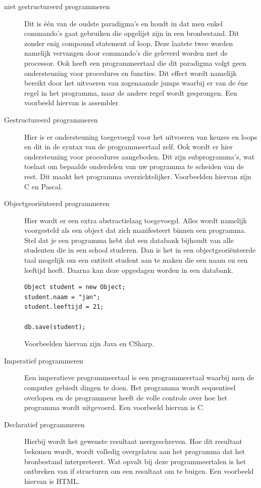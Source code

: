 \documentclass[11pt,a4paper]{article}
\begin{document}
\begin{description}
\item[niet gestructureerd programmeren] Dit is één van de oudste paradigma's en houdt in dat men enkel commando's gaat gebruiken die opgelijst zijn in een bronbestand. Dit zonder enig compound statement of loop. Deze laatste twee worden namelijk vervangen door commando's die geleverd worden met de processor. Ook heeft een programmeertaal die dit paradigma volgt geen ondersteuning voor procedures en functies. Dit effect wordt namelijk bereikt door het uitvoeren van zogenaamde jumps waarbij er van de éne regel in het programma, naar de andere regel wordt gesprongen. Een voorbeeld hiervan is assembler

\item[Gestructureerd programmeren] Hier is er ondersteuning toegevoegd voor het uitvoeren van keuzes en loops en dit in de syntax van de programmeertaal zelf. Ook wordt er hier ondersteuning voor procedures aangeboden. Dit zijn subprogramma's, wat toelaat om bepaalde onderdelen van uw programma te scheiden van de rest. Dit maakt het programma overzichtelijker. Voorbeelden hiervan zijn C en Pascal.

\item[Objectgeoriënteerd programmeren] Hier wordt er een extra abstractielaag toegevoegd. Alles wordt namelijk voorgesteld als een object dat zich manifesteert binnen een programma. Stel dat je een programma hebt dat een databank bijhoudt van alle studenten die in een school studeren. Dan is het in een objectgeoriënteerde taal mogelijk om een entiteit student aan te maken die een naam en een leeftijd heeft. Daarna kan deze opgeslagen worden in een databank.

\begin{verbatim}
Object student = new Object;
student.naam = "jan";
student.leeftijd = 21;

db.save(student);
\end{verbatim}

Voorbeelden hiervan zijn Java en CSharp.

\item[Imperatief programmeren] Een imperatieve programmeertaal is een programmeertaal waarbij men de computer gebiedt dingen te doen. Het programma wordt sequentieel overlopen en de programmeur heeft de volle controle over hoe het programma wordt uitgevoerd. Een voorbeeld hiervan is C.

\item[Declaratief programmeren] Hierbij wordt het gewenste resultaat neergeschreven. Hoe dit resultaat bekomen wordt, wordt volledig overgelaten aan het programma dat het bronbestand interpreteert. Wat opvalt bij deze programmeertalen is het ontbreken van if structuren om een resultaat om te buigen. Een voorbeeld hiervan is HTML.


\end{description}
\end{document}
